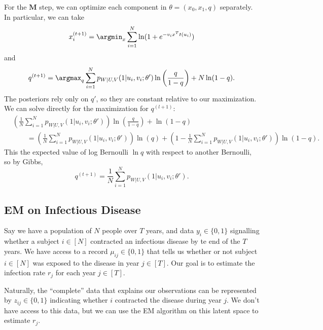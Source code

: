 For the $\mathbf{M}$ step, we can optimize each component in $\theta=(x_0,x_1,q)$ separately. In particular, we can take 
\[x_i^{(t+1)} = \argmin_{x} \sum_{i=1}^N \ln(1 + e^{-v_ix^Tt(u_i)})\]
and 
\[q^{(t+1)} = \argmax_{q} \sum_{i=1}^N p_{W|U,V}(1|u_i,v_i;\theta')\ln \left(\frac{q}{1-q}\right) + N\ln(1-q).\] 
The posteriors rely only on $q'$, so they are constant relative to our maximization. We can solve directly for the maximization for $q^{(l+1)}$: 
\begin{align*}
&\left(\frac{1}{N}\sum_{i=1}^N p_{W|U,V}(1|u_i,v_i;\theta')\right)\ln\left(\frac{q}{1-q}\right) + \ln(1-q) \\
&\qquad = \left(\frac{1}{N}\sum_{i=1}^N p_{W|U,V}(1|u_i,v_i;\theta')\right) \ln (q) + \left(1 - \frac{1}{N}\sum_{i=1}^N p_{W|U,V}(1|u_i,v_i;\theta')\right)\ln (1-q). 
\end{align*}
This the expected value of log Bernoulli $\ln q$ with respect to another Bernoulli, so by Gibbs,
\[q^{(t+1)} = \frac{1}{N}\sum_{i=1}^N p_{W|U,V}(1|u_i,v_i;\theta').\] 

\subsection{EM on Infectious Disease}

Say we have a population of $N$ people over $T$ years, and data $y_i\in \{0,1\}$ signalling whether a subject $i\in [N]$ contracted an infectious disease by te end of the $T$ years. We have access to a record $\mu_{ij}\in \{0,1\}$ that tells us whether or not subject $i\in [N]$ was exposed to the disease in year $j\in [T]$. Our goal is to estimate the infection rate $r_j$ for each year $j\in [T]$. 

Naturally, the ``complete'' data that explains our observations can be represented by $z_{ij}\in \{0,1\}$ indicating whether $i$ contracted the disease during year $j$. We don't have access to this data, but we can use the EM algorithm on this latent space to estimate $r_j$. 

\V

